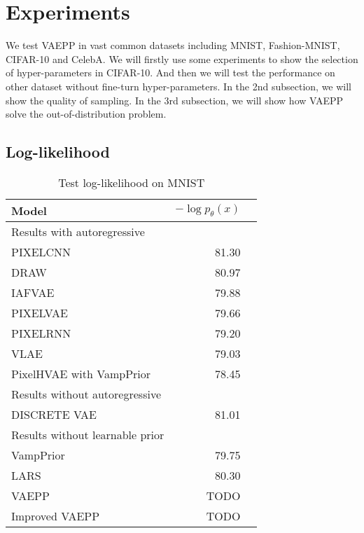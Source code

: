 \section{Experiments}
We test VAEPP in vast common datasets including MNIST, Fashion-MNIST, CIFAR-10 and CelebA. 
We will firstly use some experiments to show the selection of hyper-parameters in CIFAR-10. And then we will test the performance on other dataset without fine-turn hyper-parameters. In the 2nd subsection, we will show the quality of sampling. In the 3rd subsection, we will show how VAEPP solve the out-of-distribution problem. 
\subsection{Log-likelihood}

\begin{table}[tb]
\centering
\begin{tabular}{lrr}  
\toprule
Model  &  $-\log p_\theta(x)$ \\
\midrule
Results with autoregressive   \\
PIXELCNN         &  81.30      \\
DRAW             &  80.97      \\
IAFVAE           &  79.88      \\
PIXELVAE         &  79.66      \\
PIXELRNN         &  79.20      \\
VLAE             &  79.03      \\
PixelHVAE with VampPrior        &  78.45      \\
\midrule
Results without autoregressive   \\
DISCRETE VAE     &  81.01      \\
\midrule
Results without learnable prior   \\
VampPrior        &  79.75      \\
LARS             &  80.30     \\
VAEPP            &  TODO      \\
Improved VAEPP   &  TODO      \\
\bottomrule
\end{tabular}
\caption{Test log-likelihood on MNIST}
\label{tab:mnist-nll}
\end{table}


